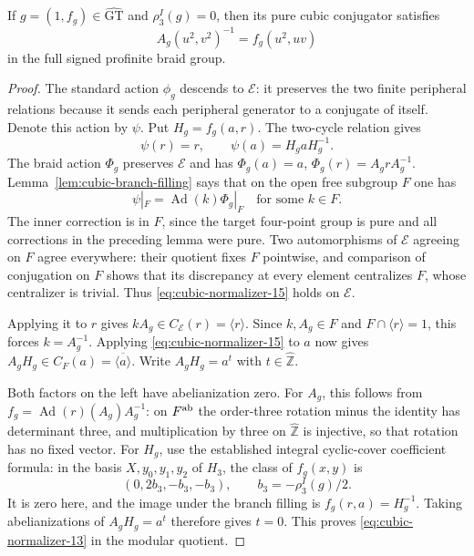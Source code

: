 \begin{proposition}\label{prop:normalized-HF1-from-normalizer}
If $g=(1,f_g)\in\widehat{\mathrm{GT}}$ and
$\rho_3^I(g)=0$, then its pure cubic conjugator satisfies
\begin{equation}\label{eq:cubic-normalizer-13}
\boxed{\quad A_g(u^2,v^2)^{-1}=f_g(u^2,uv)\quad}
\end{equation}
in the full signed profinite braid group.
\end{proposition}
\begin{proof}
The standard action $\phi_g$ descends to $\mathcal E$: it preserves
the two finite peripheral relations because it sends each
peripheral generator to a conjugate of itself. Denote this
action by $\psi$. Put $H_g=f_g(a,r)$. The two-cycle relation
gives
\begin{equation}\label{eq:cubic-normalizer-14}
\psi(r)=r,\qquad\psi(a)=H_g aH_g^{-1}.
\end{equation}
The braid action $\Phi_g$ preserves $\mathcal E$ and has
$\Phi_g(a)=a$, $\Phi_g(r)=A_g rA_g^{-1}$.
Lemma~\ref{lem:cubic-branch-filling} says that on the open
free subgroup $F$ one has
\begin{equation}\label{eq:cubic-normalizer-15}
\psi|_F=\operatorname{Ad}(k)\Phi_g|_F
                  \quad\text{for some }k\in F.
\end{equation}
The inner correction is in $F$, since the target four-point
group is pure and all corrections in the preceding lemma
were pure. Two automorphisms of $\mathcal E$ agreeing on $F$ agree
everywhere: their quotient fixes $F$ pointwise, and comparison
of conjugation on $F$ shows that its discrepancy at every
element centralizes $F$, whose centralizer is trivial.
Thus \eqref{eq:cubic-normalizer-15} holds on $\mathcal E$.

Applying it to $r$ gives $kA_g\in C_\mathcal E(r)=\langle r\rangle$.
Since $k,A_g\in F$ and $F\cap\langle r\rangle=1$, this
forces $k=A_g^{-1}$. Applying \eqref{eq:cubic-normalizer-15} to $a$ now gives
$A_gH_g\in C_F(a)=\overline{\langle a\rangle}$.
Write $A_gH_g=a^t$ with $t\in\widehat{\mathbb Z}$.

Both factors on the left have abelianization zero.
For $A_g$, this follows from
$f_g=\operatorname{Ad}(r)(A_g)A_g^{-1}$: on $F^{\rm ab}$
the order-three rotation minus the identity has determinant
three, and multiplication by three on $\widehat{\mathbb Z}$
is injective, so that rotation has no fixed vector. For $H_g$, use
the established integral cyclic-cover coefficient formula:
in the basis $X,y_0,y_1,y_2$ of $H_3$, the class of
$f_g(x,y)$ is
\[
 (0,2b_3,-b_3,-b_3),\qquad b_3=-\rho_3^I(g)/2.
\]
It is zero here, and the image under the branch filling is
$f_g(r,a)=H_g^{-1}$. Taking abelianizations of
$A_gH_g=a^t$ therefore gives $t=0$. This proves \eqref{eq:cubic-normalizer-13} in
the modular quotient.


\end{proof}
